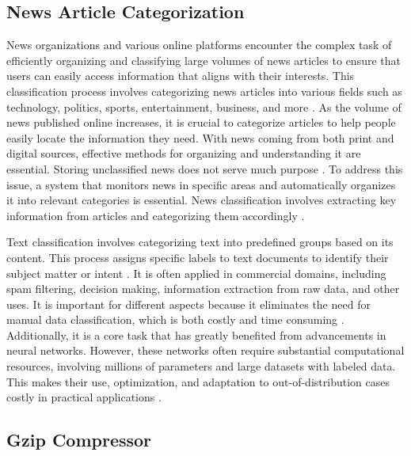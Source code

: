 \subsection{News Article Categorization}

News organizations and various online platforms encounter the complex task of efficiently organizing and classifying large volumes of news articles to ensure that users can easily access information that aligns with their interests. This classification process involves categorizing news articles into various fields such as technology, politics, sports, entertainment, business, and more \cite{Volety2024}. As the volume of news published online increases, it is crucial to categorize articles to help people easily locate the information they need. With news coming from both print and digital sources, effective methods for organizing and understanding it are essential. Storing unclassified news does not serve much purpose \cite{Singh2021}. To address this issue, a system that monitors news in specific areas and automatically organizes it into relevant categories is essential. News classification involves extracting key information from articles and categorizing them accordingly \cite{Dogra2022}.

Text classification involves categorizing text into predefined groups based on its content. This process assigns specific labels to text documents to identify their subject matter or intent \cite{Zhang2023}. It is often applied in commercial domains, including spam filtering, decision making, information extraction from raw data, and other uses. It is important for different aspects because it eliminates the need for manual data classification, which is both costly and time consuming \cite{Hassan2022}. Additionally, it is a core task that has greatly benefited from advancements in neural networks. However, these networks often require substantial computational resources, involving millions of parameters and large datasets with labeled data. This makes their use, optimization, and adaptation to out-of-distribution cases costly in practical applications \cite{Peters2023}.

\subsection{Gzip Compressor}

